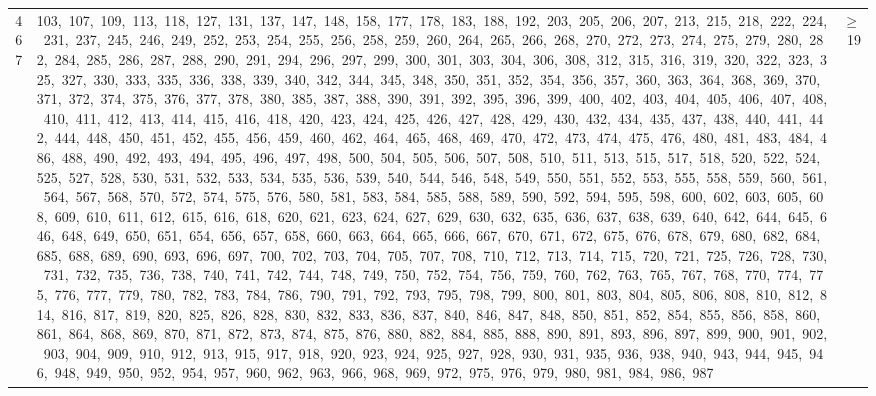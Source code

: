 \begin{longtable}{c|p{}|r}
467 & 103,\ 107,\ 109,\ 113,\ 118,\ 127,\ 131,\ 137,\ 147,\ 148,\ 158,\ 177,\ 178,\ 183,\ 188,\ 192,\ 203,\ 205,\ 206,\ 207,\ 213,\ 215,\ 218,\ 222,\ 224,\ 231,\ 237,\ 245,\ 246,\ 249,\ 252,\ 253,\ 254,\ 255,\ 256,\ 258,\ 259,\ 260,\ 264,\ 265,\ 266,\ 268,\ 270,\ 272,\ 273,\ 274,\ 275,\ 279,\ 280,\ 282,\ 284,\ 285,\ 286,\ 287,\ 288,\ 290,\ 291,\ 294,\ 296,\ 297,\ 299,\ 300,\ 301,\ 303,\ 304,\ 306,\ 308,\ 312,\ 315,\ 316,\ 319,\ 320,\ 322,\ 323,\ 325,\ 327,\ 330,\ 333,\ 335,\ 336,\ 338,\ 339,\ 340,\ 342,\ 344,\ 345,\ 348,\ 350,\ 351,\ 352,\ 354,\ 356,\ 357,\ 360,\ 363,\ 364,\ 368,\ 369,\ 370,\ 371,\ 372,\ 374,\ 375,\ 376,\ 377,\ 378,\ 380,\ 385,\ 387,\ 388,\ 390,\ 391,\ 392,\ 395,\ 396,\ 399,\ 400,\ 402,\ 403,\ 404,\ 405,\ 406,\ 407,\ 408,\ 410,\ 411,\ 412,\ 413,\ 414,\ 415,\ 416,\ 418,\ 420,\ 423,\ 424,\ 425,\ 426,\ 427,\ 428,\ 429,\ 430,\ 432,\ 434,\ 435,\ 437,\ 438,\ 440,\ 441,\ 442,\ 444,\ 448,\ 450,\ 451,\ 452,\ 455,\ 456,\ 459,\ 460,\ 462,\ 464,\ 465,\ 468,\ 469,\ 470,\ 472,\ 473,\ 474,\ 475,\ 476,\ 480,\ 481,\ 483,\ 484,\ 486,\ 488,\ 490,\ 492,\ 493,\ 494,\ 495,\ 496,\ 497,\ 498,\ 500,\ 504,\ 505,\ 506,\ 507,\ 508,\ 510,\ 511,\ 513,\ 515,\ 517,\ 518,\ 520,\ 522,\ 524,\ 525,\ 527,\ 528,\ 530,\ 531,\ 532,\ 533,\ 534,\ 535,\ 536,\ 539,\ 540,\ 544,\ 546,\ 548,\ 549,\ 550,\ 551,\ 552,\ 553,\ 555,\ 558,\ 559,\ 560,\ 561,\ 564,\ 567,\ 568,\ 570,\ 572,\ 574,\ 575,\ 576,\ 580,\ 581,\ 583,\ 584,\ 585,\ 588,\ 589,\ 590,\ 592,\ 594,\ 595,\ 598,\ 600,\ 602,\ 603,\ 605,\ 608,\ 609,\ 610,\ 611,\ 612,\ 615,\ 616,\ 618,\ 620,\ 621,\ 623,\ 624,\ 627,\ 629,\ 630,\ 632,\ 635,\ 636,\ 637,\ 638,\ 639,\ 640,\ 642,\ 644,\ 645,\ 646,\ 648,\ 649,\ 650,\ 651,\ 654,\ 656,\ 657,\ 658,\ 660,\ 663,\ 664,\ 665,\ 666,\ 667,\ 670,\ 671,\ 672,\ 675,\ 676,\ 678,\ 679,\ 680,\ 682,\ 684,\ 685,\ 688,\ 689,\ 690,\ 693,\ 696,\ 697,\ 700,\ 702,\ 703,\ 704,\ 705,\ 707,\ 708,\ 710,\ 712,\ 713,\ 714,\ 715,\ 720,\ 721,\ 725,\ 726,\ 728,\ 730,\ 731,\ 732,\ 735,\ 736,\ 738,\ 740,\ 741,\ 742,\ 744,\ 748,\ 749,\ 750,\ 752,\ 754,\ 756,\ 759,\ 760,\ 762,\ 763,\ 765,\ 767,\ 768,\ 770,\ 774,\ 775,\ 776,\ 777,\ 779,\ 780,\ 782,\ 783,\ 784,\ 786,\ 790,\ 791,\ 792,\ 793,\ 795,\ 798,\ 799,\ 800,\ 801,\ 803,\ 804,\ 805,\ 806,\ 808,\ 810,\ 812,\ 814,\ 816,\ 817,\ 819,\ 820,\ 825,\ 826,\ 828,\ 830,\ 832,\ 833,\ 836,\ 837,\ 840,\ 846,\ 847,\ 848,\ 850,\ 851,\ 852,\ 854,\ 855,\ 856,\ 858,\ 860,\ 861,\ 864,\ 868,\ 869,\ 870,\ 871,\ 872,\ 873,\ 874,\ 875,\ 876,\ 880,\ 882,\ 884,\ 885,\ 888,\ 890,\ 891,\ 893,\ 896,\ 897,\ 899,\ 900,\ 901,\ 902,\ 903,\ 904,\ 909,\ 910,\ 912,\ 913,\ 915,\ 917,\ 918,\ 920,\ 923,\ 924,\ 925,\ 927,\ 928,\ 930,\ 931,\ 935,\ 936,\ 938,\ 940,\ 943,\ 944,\ 945,\ 946,\ 948,\ 949,\ 950,\ 952,\ 954,\ 957,\ 960,\ 962,\ 963,\ 966,\ 968,\ 969,\ 972,\ 975,\ 976,\ 979,\ 980,\ 981,\ 984,\ 986,\ 987 & $\ge$ 19 \\

\end{longtable}
